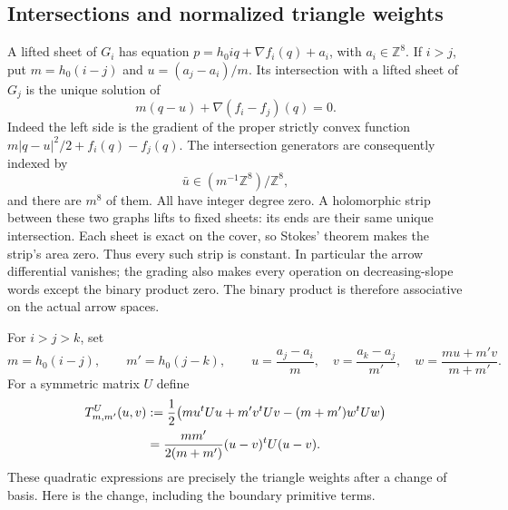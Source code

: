 \documentclass[11pt]{article}
\theoremstyle{definition}
\theoremstyle{remark}
\numberwithin{equation}{section}
\begin{document}
\subsection{Intersections and normalized triangle weights}

A lifted sheet of $G_i$ has equation
$p=h_0i q+\nabla f_i(q)+a_i$, with $a_i\in\mathbb Z^8$.  If $i>j$, put
$m=h_0(i-j)$ and $u=(a_j-a_i)/m$.  Its intersection with a lifted sheet of
$G_j$ is the unique solution of
\begin{equation}\label{theta:intersection}
 m(q-u)+\nabla(f_i-f_j)(q)=0.
\end{equation}
Indeed the left side is the gradient of the proper strictly convex function
$m|q-u|^2/2+f_i(q)-f_j(q)$.  The intersection generators are consequently
indexed by
\[
 \bar u\in (m^{-1}\mathbb Z^8)/\mathbb Z^8,
\]
and there are $m^8$ of them.  All have integer degree zero.  A holomorphic
strip between these two graphs lifts to fixed sheets: its ends are their
same unique intersection.  Each sheet is exact on the cover, so Stokes'
theorem makes the strip's area zero.  Thus every such strip is constant.
In particular the arrow differential vanishes; the grading also makes
every operation on decreasing-slope words except the binary product zero.
The binary product is therefore associative on the actual arrow spaces.

For $i>j>k$, set
\[
 m=h_0(i-j),\qquad m'=h_0(j-k),\qquad
 u=\frac{a_j-a_i}{m},\quad v=\frac{a_k-a_j}{m'},\quad
 w=\frac{mu+m'v}{m+m'}.
\]
For a symmetric matrix $U$ define
\begin{align}
 T^U_{m,m'}(u,v)
 &:=\frac12\bigl(mu^tUu+m'v^tUv-(m+m')w^tUw\bigr)\notag\\
 &=\frac{mm'}{2(m+m')}(u-v)^tU(u-v).
 \label{theta:quadratic}
\end{align}
These quadratic expressions are precisely the triangle weights after a
change of basis.  Here is the change, including the boundary primitive
terms.
\end{document}
